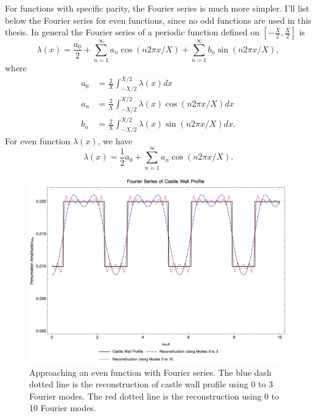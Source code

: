 For functions with specific parity, the Fourier series is much more simpler. I'll list below the Fourier series for even functions, since no odd functions are used in this thesis. In general the Fourier series of a periodic function defined on $\left[ -\frac{X}{2}, \frac{X}{2} \right]$ is
\begin{equation}
      \lambda(x) = \frac{a_0}{2} + \sum_{n=1}^\infty a_n \cos(n 2\pi x/X) + \sum_{n=1}^\infty b_n \sin(n 2\pi x/X),
\end{equation}
where
\begin{align}
    a_0 & = \frac{2}{X} \int^{X/2}_{-X/2} \lambda(x) d x \\
    a_n & = \frac{2}{X} \int_{-X/2}^{X/2} \lambda(x) \cos ( n2\pi x/X ) dx\\
    b_n & = \frac{2}{X} \int_{-X/2}^{X/2} \lambda(x) \sin( n 2\pi x/X ) dx.
\end{align}
For even function $\lambda(x)$, we have
\begin{equation}
      \lambda(x) = \frac{1}{2}a_0 + \sum_{n=1}^\infty a_n \cos (n 2\pi x/X).
\end{equation}

\begin{figure}
    \centering
    \includegraphics[width=\textwidth]{chapters/assets/app/reconstruction-of-even-castle-wall-0point01-0point02-1-1point8.png}
    \caption{Approaching an even function with Fourier series. The blue dash dotted line is the reconstruction of castle wall profile using 0 to 3 Fourier modes. The red dotted line is the reconstruction using 0 to 10 Fourier modes. }
    \label{app-chap:convention-sec:fourier-series-eqn:parametric-resonance-castle-wall-fourier-coeff-even}
\end{figure}

